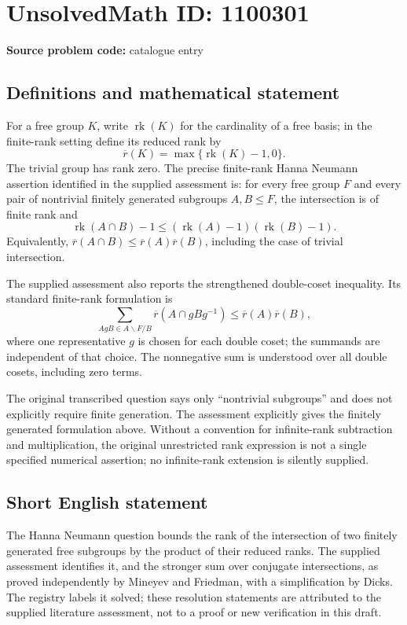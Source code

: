 \documentclass[11pt]{article}
\begin{document}
\section*{UnsolvedMath ID: 1100301}
\textbf{Source problem code:} catalogue entry
\subsection{Definitions and mathematical statement}
For a free group $K$, write $\operatorname{rk}(K)$ for the cardinality of a free basis; in the finite-rank setting define its reduced rank by
\[
 \overline r(K)=\max\{\operatorname{rk}(K)-1,0\}.
\]
The trivial group has rank zero. The precise finite-rank Hanna Neumann assertion identified in the supplied assessment is: for every free group $F$ and every pair of nontrivial finitely generated subgroups $A,B\leq F$, the intersection is of finite rank and
\[
 \operatorname{rk}(A\cap B)-1
 \leq(\operatorname{rk}(A)-1)(\operatorname{rk}(B)-1).
\]
Equivalently, $\overline r(A\cap B)\leq\overline r(A)\overline r(B)$, including the case of trivial intersection.

The supplied assessment also reports the strengthened double-coset inequality. Its standard finite-rank formulation is
\[
 \sum_{AgB\in A\backslash F/B}
 \overline r(A\cap gBg^{-1})
 \leq \overline r(A)\overline r(B),
\]
where one representative $g$ is chosen for each double coset; the summands are independent of that choice. The nonnegative sum is understood over all double cosets, including zero terms.

The original transcribed question says only ``nontrivial subgroups'' and does not explicitly require finite generation. The assessment explicitly gives the finitely generated formulation above. Without a convention for infinite-rank subtraction and multiplication, the original unrestricted rank expression is not a single specified numerical assertion; no infinite-rank extension is silently supplied.
\subsection{Short English statement}
The Hanna Neumann question bounds the rank of the intersection of two finitely generated free subgroups by the product of their reduced ranks. The supplied assessment identifies it, and the stronger sum over conjugate intersections, as proved independently by Mineyev and Friedman, with a simplification by Dicks. The registry labels it solved; these resolution statements are attributed to the supplied literature assessment, not to a proof or new verification in this draft.
\end{document}
